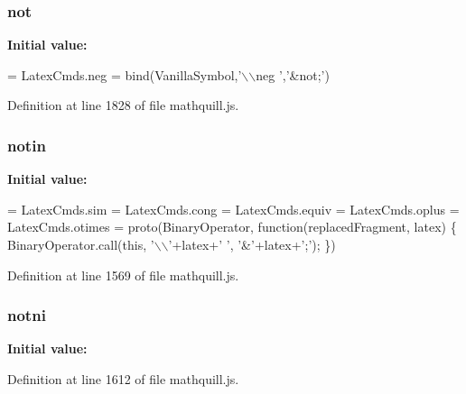 \subsubsection[{not}]{ not}\label{mathquill_8js_ac1e1ab538c27d68cc2cbafea74e7412c}
{\bfseries Initial value\-:}
\begin{DoxyCode}
= 
LatexCmds.neg = bind(VanillaSymbol,\textcolor{stringliteral}{'\(\backslash\)\(\backslash\)neg '},\textcolor{stringliteral}{'&not;'})
\end{DoxyCode}


Definition at line 1828 of file mathquill.\-js.

\subsubsection[{notin}]{ notin}\label{mathquill_8js_a30f3d401659054df2071caa15860b266}
{\bfseries Initial value\-:}
\begin{DoxyCode}
=
LatexCmds.sim =
LatexCmds.cong =
LatexCmds.equiv =
LatexCmds.oplus =
LatexCmds.otimes = proto(BinaryOperator, \textcolor{keyword}{function}(replacedFragment, latex) \{
  BinaryOperator.call(\textcolor{keyword}{this}, \textcolor{charliteral}{'\(\backslash\)\(\backslash\)'}+latex+\textcolor{charliteral}{' '}, \textcolor{charliteral}{'&'}+latex+\textcolor{charliteral}{';'});
\})
\end{DoxyCode}


Definition at line 1569 of file mathquill.\-js.

\subsubsection[{notni}]{ notni}\label{mathquill_8js_afb4989a4f23f2296a181075d3decc2b2}
{\bfseries Initial value\-:}


Definition at line 1612 of file mathquill.\-js.

